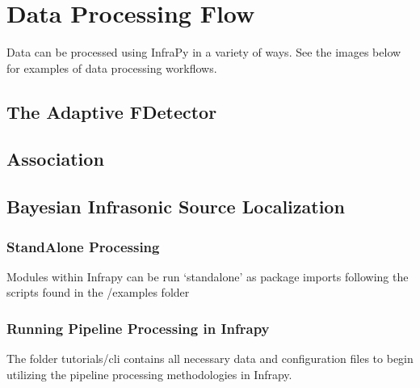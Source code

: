 \documentclass[letterpaper,10pt,english]{sphinxmanual}
\begin{document}
\section{Data Processing Flow}
\label{\detokenize{processing_model:data-processing-flow}}\label{\detokenize{processing_model:dataprocess}}\label{\detokenize{processing_model::doc}}
Data can be processed using InfraPy in a variety of ways.  See the images below for examples of data processing workflows.


\subsection{The Adaptive F\sphinxhyphen{}Detector}
\label{\detokenize{processing_model:afd}}
\noindent{}


\subsection{Association}
\label{\detokenize{processing_model:association}}
\noindent{}


\subsection{Bayesian Infrasonic Source Localization}
\label{\detokenize{processing_model:localization}}
\noindent{}


\subsubsection{Stand\sphinxhyphen{}Alone Processing}
\label{\detokenize{standalone:stand-alone-processing}}\label{\detokenize{standalone:standalone}}\label{\detokenize{standalone::doc}}
Modules within Infrapy can be run ‘stand\sphinxhyphen{}alone’ as package imports following the scripts found in the /examples folder


\subsubsection{Running Pipeline Processing in Infrapy}
\label{\detokenize{pipeline:running-pipeline-processing-in-infrapy}}\label{\detokenize{pipeline:pipeline}}\label{\detokenize{pipeline::doc}}
The folder tutorials/cli contains all necessary data and configuration files to begin utilizing the pipeline processing methodologies in Infrapy.
\end{document}
